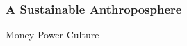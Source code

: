 \documentclass[12pt, letterpaper]{article}
\begin{document}
\subsubsection{A Sustainable Anthroposphere}
\begin{outline}[enumerate]
\1 Money
\1 Power
\1 Culture

\end{outline}







\clearpage 
\renewcommand{\thepage}{}
\printbibliography
\end{document}
